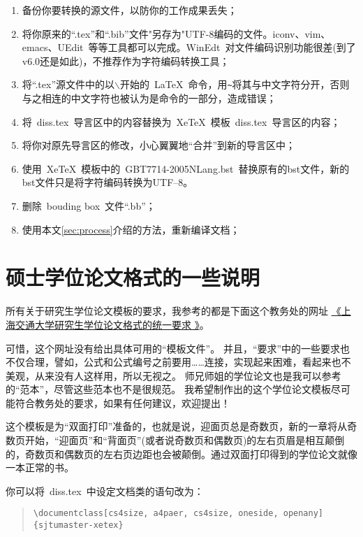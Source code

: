 \begin{enumerate}
\item 备份你要转换的源文件，以防你的工作成果丢失；
\item 将你原来的``.tex''和``.bib''文件"另存为"UTF-8编码的文件。iconv、vim、emacs、UEdit~等等工具都可以完成。WinEdt~对文件编码识别功能很差(到了v6.0还是如此)，不推荐作为字符编码转换工具；
\item 将``.tex''源文件中的以$\backslash$开始的~\LaTeX~命令，用\verb|~|将其与中文字符分开，否则与之相连的中文字符也被认为是命令的一部分，造成错误；
\item 将~diss.tex~导言区中的内容替换为~XeTeX~模板~diss.tex~导言区的内容；
\item 将你对原先导言区的修改，小心翼翼地``合并''到新的导言区中；
\item 使用~XeTeX~模板中的~GBT7714-2005NLang.bst~替换原有的bst文件，新的bst文件只是将字符编码转换为UTF--8。
\item 删除~bouding box~文件``.bb''；
\item 使用本文\ref{sec:process}介绍的方法，重新编译文档；
\end{enumerate}

\section{硕士学位论文格式的一些说明}
\label{sec:thesisformat}

所有关于研究生学位论文模板的要求，我参考的都是下面这个教务处的网址
\href{http://www.gs.sjtu.edu.cn/policy/fileShow.ahtml?id=130}{《上海交通大学研究生学位论文格式的统一要求 》}。

可惜，这个网址没有给出具体可用的“模板文件”。
并且，``要求''中的一些要求也不仅合理，譬如，公式和公式编号之前要用……连接，实现起来困难，看起来也不美观，从来没有人这样用，所以无视之。
师兄师姐的学位论文也是我可以参考的“范本”，尽管这些范本也不是很规范。
我希望制作出的这个学位论文模板尽可能符合教务处的要求，如果有任何建议，欢迎提出！

这个模板是为``双面打印''准备的，也就是说，迎面页总是奇数页，新的一章将从奇数页开始，``迎面页''和``背面页''(或者说奇数页和偶数页)的左右页眉是相互颠倒的，奇数页和偶数页的左右页边距也会被颠倒。通过双面打印得到的学位论文就像一本正常的书。

你可以将~diss.tex~中设定文档类的语句改为：

\begin{quote}
  {\scriptsize\verb+\documentclass[cs4size, a4paer, cs4size, oneside, openany]{sjtumaster-xetex}+}
\end{quote}

